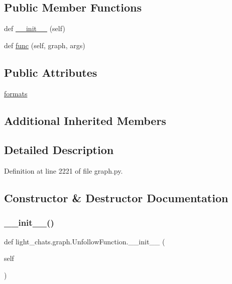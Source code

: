 \subsection*{Public Member Functions}
\begin{DoxyCompactItemize}
\item 
def \hyperlink{classlight__chats_1_1graph_1_1UnfollowFunction_adaf6e40567b940e2b467208eae9507c9}{\+\_\+\+\_\+init\+\_\+\+\_\+} (self)
\item 
def \hyperlink{classlight__chats_1_1graph_1_1UnfollowFunction_a09b37c0a471f8dd65216e434a98983af}{func} (self, graph, args)
\end{DoxyCompactItemize}
\subsection*{Public Attributes}
\begin{DoxyCompactItemize}
\item 
\hyperlink{classlight__chats_1_1graph_1_1UnfollowFunction_a9b7464a052add385de3d685e1627fcf5}{formats}
\end{DoxyCompactItemize}
\subsection*{Additional Inherited Members}


\subsection{Detailed Description}


Definition at line 2221 of file graph.\+py.



\subsection{Constructor \& Destructor Documentation}
\mbox{\label{classlight__chats_1_1graph_1_1UnfollowFunction_adaf6e40567b940e2b467208eae9507c9}} 
\subsubsection{\texorpdfstring{\+\_\+\+\_\+init\+\_\+\+\_\+()}{\_\_init\_\_()}}
{\footnotesize\ttfamily def light\+\_\+chats.\+graph.\+Unfollow\+Function.\+\_\+\+\_\+init\+\_\+\+\_\+ (\begin{DoxyParamCaption}\item[{}]{self }\end{DoxyParamCaption})}



